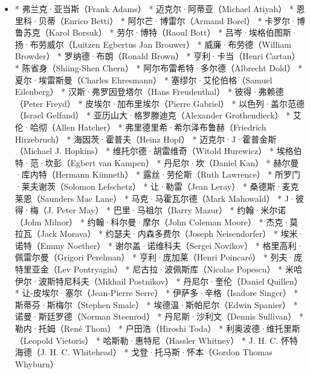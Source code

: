 \begin{itemize}
\item * 弗兰克·亚当斯（Frank Adams）
* 迈克尔·阿蒂亚（Michael Atiyah）
* 恩里科·贝蒂（Enrico Betti）
* 阿尔芒·博雷尔（Armand Borel）
* 卡罗尔·博鲁苏克（Karol Borsuk）
* 劳尔·博特（Raoul Bott）
* 吕岑·埃格伯图斯·扬·布劳威尔（Luitzen Egbertus Jan Brouwer）
* 威廉·布劳德（William Browder）
* 罗纳德·布朗（Ronald Brown）
* 亨利·卡当（Henri Cartan）
* 陈省身（Shiing-Shen Chern）
* 阿尔布雷希特·多尔德（Albrecht Dold）
* 夏尔·埃雷斯曼（Charles Ehresmann）
* 塞缪尔·艾伦伯格（Samuel Eilenberg）
* 汉斯·弗罗因登塔尔（Hans Freudenthal）
* 彼得·弗赖德（Peter Freyd）
* 皮埃尔·加布里埃尔（Pierre Gabriel）
* 以色列·盖尔范德（Israel Gelfand）
* 亚历山大·格罗滕迪克（Alexander Grothendieck）
* 艾伦·哈彻（Allen Hatcher）
* 弗里德里希·希尔泽布鲁赫（Friedrich Hirzebruch）
* 海因茨·霍普夫（Heinz Hopf）
* 迈克尔·J·霍普金斯（Michael J. Hopkins）
* 维托尔德·胡雷维奇（Witold Hurewicz）
* 埃格伯特·范·坎彭（Egbert van Kampen）
* 丹尼尔·坎（Daniel Kan）
* 赫尔曼·库内特（Hermann Künneth）
* 露丝·劳伦斯（Ruth Lawrence）
* 所罗门·莱夫谢茨（Solomon Lefschetz）
* 让·勒雷（Jean Leray）
* 桑德斯·麦克莱恩（Saunders Mac Lane）
* 马克·马霍瓦尔德（Mark Mahowald）
* J·彼得·梅（J. Peter May）
* 巴里·马祖尔（Barry Mazur）
* 约翰·米尔诺（John Milnor）
* 约翰·科尔曼·摩尔（John Coleman Moore）
* 杰克·莫拉瓦（Jack Morava）
* 约瑟夫·内森多费尔（Joseph Neisendorfer）
* 埃米·诺特（Emmy Noether）
* 谢尔盖·诺维科夫（Sergei Novikov）
* 格里高利·佩雷尔曼（Grigori Perelman）
* 亨利·庞加莱（Henri Poincaré）
* 列夫·庞特里亚金（Lev Pontryagin）
* 尼古拉·波佩斯库（Nicolae Popescu）
* 米哈伊尔·波斯特尼科夫（Mikhail Postnikov）
* 丹尼尔·奎伦（Daniel Quillen）
* 让-皮埃尔·塞尔（Jean-Pierre Serre）
* 伊萨多·辛格（Isadore Singer）
* 斯蒂芬·斯梅尔（Stephen Smale）
* 埃德温·斯帕尼尔（Edwin Spanier）
* 诺曼·斯廷罗德（Norman Steenrod）
* 丹尼斯·沙利文（Dennis Sullivan）
* 勒内·托姆（René Thom）
* 户田浩（Hiroshi Toda）
* 利奥波德·维托里斯（Leopold Vietoris）
* 哈斯勒·惠特尼（Hassler Whitney）
* J. H. C. 怀特海德（J. H. C. Whitehead）
* 戈登·托马斯·怀本（Gordon Thomas Whyburn）

\end{itemize}